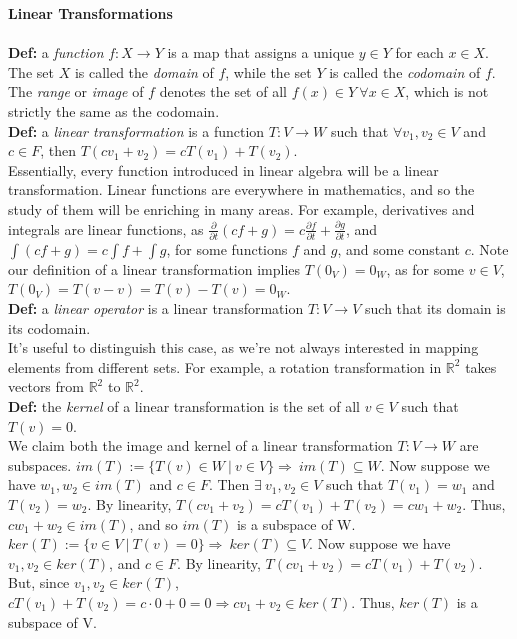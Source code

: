 \documentclass[12pt]{article}
\begin{document}
\textbf{\Large Linear Transformations}
\\\\
\textbf{Def: }a \emph{function} $f: X \rightarrow Y$ is a map that assigns a unique $y \in Y$ for each $x \in X$. The set $X$ is called the \emph{domain} of $f$, while the set $Y$ is called the \emph{codomain} of $f$. The \emph{range} or \emph{image} of $f$ denotes the set of all $f(x) \in Y\  \forall x \in X$, which is not strictly the same as the codomain.\\

\textbf{Def: }a \emph{linear transformation} is a function $T: V \rightarrow W$ such that $\forall v_1, v_2 \in V$ and $c \in F$, then $T(cv_1 + v_2) = cT(v_1) + T(v_2)$.\\

Essentially, every function introduced in linear algebra will be a linear transformation. Linear functions are everywhere in mathematics, and so the study of them will be enriching in many areas. For example, derivatives and integrals are linear functions, as $\frac{\partial}{\partial t}(cf + g) = c \frac{\partial f}{\partial t} + \frac{\partial g}{\partial t}$, and $\int (cf + g) = c \int f + \int g$, for some functions $f$ and $g$, and some constant $c$. Note our definition of a linear transformation implies $T(0_V) = 0_W$, as for some $v \in V$, $T(0_V) = T(v - v) = T(v) - T(v) = 0_W$.\\

\textbf{Def: }a \emph{linear operator} is a linear transformation $T: V \rightarrow V$ such that its domain is its codomain.\\

It's useful to distinguish this case, as we're not always interested in mapping elements from different sets. For example, a rotation transformation in $\mathbb{R}^2$ takes vectors from $\mathbb{R}^2$ to $\mathbb{R}^2$.\\

\textbf{Def: }the \emph{kernel} of a linear transformation is the set of all $v \in V$ such that $T(v) = 0$.\\

We claim both the image and kernel of a linear transformation $T: V \rightarrow W$ are subspaces. $im(T) := \{ T(v) \in W\ |\ v \in V\} \Rightarrow\ im(T) \subseteq W$. Now suppose we have $w_1, w_2 \in im(T)$ and $c \in F$. Then $\exists\ v_1, v_2 \in V$ such that $T(v_1) = w_1$ and $T(v_2) = w_2$. By linearity, $T(c v_1 + v_2) = cT(v_1) + T(v_2) = c w_1 + w_2$. Thus, $c w_1 + w_2 \in im(T)$, and so $im(T)$ is a subspace of W. $ker(T) := \{ v \in V\ |\ T(v) = 0 \} \Rightarrow\ ker(T) \subseteq V$. Now suppose we have $v_1, v_2 \in ker(T)$, and $c \in F$. By linearity, $T(c v_1 + v_2) = cT(v_1) + T(v_2)$. But, since $v_1, v_2 \in ker(T)$, $cT(v_1) + T(v_2) = c \cdot 0 + 0 = 0 \Rightarrow c v_1 + v_2 \in ker(T)$. Thus, $ker(T)$ is a subspace of V.\\
\end{document}
